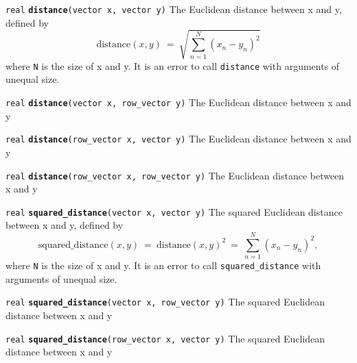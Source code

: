 \documentclass[
  10pt,
]{book}
\begin{document}

\texttt{real} \textbf{\texttt{distance}}\texttt{(vector\ x,\ vector\ y)}\newline
The Euclidean distance between x and y, defined by \[
\text{distance}(x,y) \ = \ \sqrt{\textstyle \sum_{n=1}^N (x_n -
y_n)^2} \] where \texttt{N} is the size of x and y. It is an error to call
\texttt{distance} with arguments of unequal size.


\texttt{real} \textbf{\texttt{distance}}\texttt{(vector\ x,\ row\_vector\ y)}\newline
The Euclidean distance between x and y


\texttt{real} \textbf{\texttt{distance}}\texttt{(row\_vector\ x,\ vector\ y)}\newline
The Euclidean distance between x and y


\texttt{real} \textbf{\texttt{distance}}\texttt{(row\_vector\ x,\ row\_vector\ y)}\newline
The Euclidean distance between x and y


\texttt{real} \textbf{\texttt{squared\_distance}}\texttt{(vector\ x,\ vector\ y)}\newline
The squared Euclidean distance between x and y, defined by \[
\mathrm{squared\_distance}(x,y) \ = \ \text{distance}(x,y)^2 \ = \
\textstyle \sum_{n=1}^N (x_n - y_n)^2, \] where \texttt{N} is the size of x
and y. It is an error to call \texttt{squared\_distance} with arguments of
unequal size.


\texttt{real} \textbf{\texttt{squared\_distance}}\texttt{(vector\ x,\ row\_vector\ y)}\newline
The squared Euclidean distance between x and y


\texttt{real} \textbf{\texttt{squared\_distance}}\texttt{(row\_vector\ x,\ vector\ y)}\newline
The squared Euclidean distance between x and y
\end{document}
